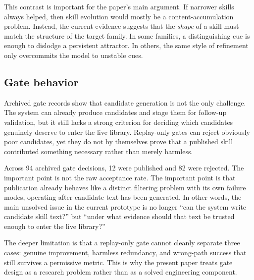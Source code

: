 \documentclass[11pt]{article}
\begin{document}
This contrast is important for the paper's main argument.  If narrower skills always
helped, then skill evolution would mostly be a content-accumulation problem.  Instead,
the current evidence suggests that the \emph{shape} of a skill must match the structure
of the target family.  In some families, a distinguishing cue is enough to dislodge a
persistent attractor.  In others, the same style of refinement only overcommits the
model to unstable cues.

\subsection{Gate behavior}

Archived gate records show that candidate generation is not the only challenge.  The
system can already produce candidates and stage them for follow-up validation, but it
still lacks a strong criterion for deciding which candidates genuinely deserve to enter
the live library.  Replay-only gates can reject obviously poor candidates, yet they do
not by themselves prove that a published skill contributed something necessary rather
than merely harmless.

Across 94 archived gate decisions, 12 were published and 82 were rejected.  The
important point is not the raw acceptance rate.  The important point is that publication
already behaves like a distinct filtering problem with its own failure modes, operating
after candidate text has been generated.  In other words, the main unsolved issue in the
current prototype is no longer ``can the system write candidate skill text?'' but
``under what evidence should that text be trusted enough to enter the live library?''

The deeper limitation is that a replay-only gate cannot cleanly separate three cases:
genuine improvement, harmless redundancy, and wrong-path success that still survives a
permissive metric.  This is why the present paper treats gate design as a research
problem rather than as a solved engineering component.
\end{document}
